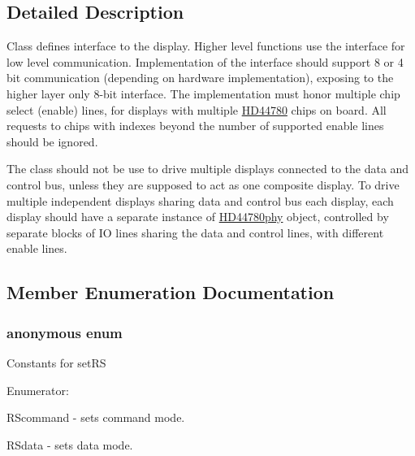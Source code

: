 \subsection{Detailed Description}
Class defines interface to the display. Higher level functions use the interface for low level communication. Implementation of the interface should support 8 or 4 bit communication (depending on hardware implementation), exposing to the higher layer only 8-\/bit interface. The implementation must honor multiple chip select (enable) lines, for displays with multiple \hyperlink{class_h_d44780}{H\-D44780} chips on board. All requests to chips with indexes beyond the number of supported enable lines should be ignored.

The class should not be use to drive multiple displays connected to the data and control bus, unless they are supposed to act as one composite display. To drive multiple independent displays sharing data and control bus each display, each display should have a separate instance of \hyperlink{class_h_d44780phy}{H\-D44780phy} object, controlled by separate blocks of I\-O lines sharing the data and control lines, with different enable lines. 

\subsection{Member Enumeration Documentation}
\hypertarget{class_h_d44780phy_a76851a61a3a88766704db9f31098d21f}{\subsubsection[{anonymous enum}]{\setlength{\rightskip}{0pt plus 5cm}anonymous enum}}\label{class_h_d44780phy_a76851a61a3a88766704db9f31098d21f}
Constants for set\-R\-S \begin{Desc}
\item[Enumerator\-: ]\par
\begin{description}
\item[{\em 
\hypertarget{class_h_d44780phy_a76851a61a3a88766704db9f31098d21fac3d8b04a4b6fa7db3d0bfc61170e1d72}{R\-Scommand}\label{class_h_d44780phy_a76851a61a3a88766704db9f31098d21fac3d8b04a4b6fa7db3d0bfc61170e1d72}
}]R\-Scommand -\/ sets command mode. \item[{\em 
\hypertarget{class_h_d44780phy_a76851a61a3a88766704db9f31098d21fa2108dbcf0cc7b6cdcbc6235a4e765654}{R\-Sdata}\label{class_h_d44780phy_a76851a61a3a88766704db9f31098d21fa2108dbcf0cc7b6cdcbc6235a4e765654}
}]R\-Sdata -\/ sets data mode. \end{description}
\end{Desc}


